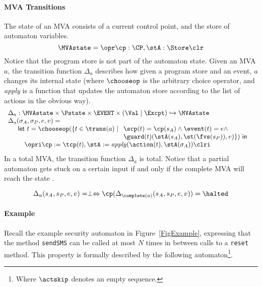 \paragraph{MVA Transitions} The state of an MVA consists of a current control
point, and the store of automaton variables.
\[
\MVAstate = \opr \cp : \CP, \stA : \Store \clr
\]
Notice that the program store is not part of the automaton
state. Given an MVA \(a\), the transition function \(\Delta_a\)
describes how given a program store and an event, \(a\) changes its
internal state (where \(\chooseop\) is the arbitrary choice operator,
and \textit{apply} is a function that updates the automaton store
according to the list of actions in the obvious way).
\[
\begin{array}{l}
\Delta_a  :  \MVAstate \times \Pstate \times \EVENT \times (\Val \mid
\Excpt) \hookrightarrow
\MVAstate\\
\Delta_a(\sigma_A, \sigma_P, e, v) = \\
\quad
\begin{array}[t]{l}
\mathsf{let\ }t = \chooseop(\{t\in \trans(a)\mid
  \begin{array}[t]{l}
     \scp(t) = \cp(s_A) \wedge \event(t) = e \wedge \\
     \guard(t)(\stA(s_A), \st(\fvs(s_P)), v)\}) \mathsf{\ in}
  \end{array}\\
\quad \opri \cp := \tcp(t), \stA := \mathit{apply}(\action(t),
\stA(\sigma_A)) \clri
\end{array}

\end{array}
\]
In a total MVA, the transition function \(\Delta_a\) is total. Notice
that a partial automaton gets stuck on a certain input if and only if the
complete MVA will reach the state \halted.

\begin{equation}\label{MVAcompletionProp}
\Delta_a(s_A, s_P, e, v) = \perp \Leftrightarrow
\cp (\Delta_{\complete(a)}(s_A, s_P, e, v)) = \halted
\end{equation}


\paragraph{Example}
Recall the example security automaton in Figure~\ref{FigExample},
expressing that the method \texttt{sendSMS} can
be called at most \(N\) times in between calls to a \texttt{reset}
method. This property is formally described by the following
automaton\footnote{Where \(\actskip\) denotes an empty sequence.}.

